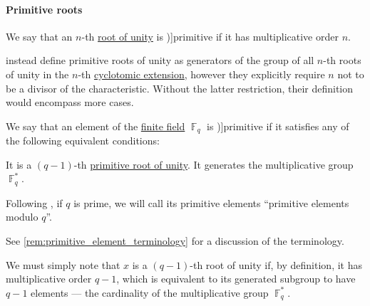 \paragraph{Primitive roots}

\begin{definition}\label{def:primitive_root_of_unity}
  We say that an \( n \)-th \hyperref[def:root_of_unity]{root of unity} is \term[ru=первообразный (корень единицы) (\cite[90]{Тыртышников2017ОсновыАлгебры})]{primitive} if it has multiplicative order \( n \).
\end{definition}
\begin{comments}
  \item \Textcite[def. 2.43]{LidlNiederreiter1997FiniteFields} instead define primitive roots of unity as generators of the group of all \( n \)-th roots of unity in the \( n \)-th \hyperref[def:cyclotomic_extension]{cyclotomic extension}, however they explicitly require \( n \) not to be a divisor of the characteristic. Without the latter restriction, their definition would encompass more cases.
\end{comments}

\begin{definition}\label{def:finite_field_primitive_element}
  We say that an element of the \hyperref[def:finite_field]{finite field} \( \BbbF_q \) is \term[en=primitive element (\cite[def. 2.9]{LidlNiederreiter1997FiniteFields})]{primitive} if it satisfies any of the following equivalent conditions:
  \begin{thmenum}
    \mimprovised It is a \( (q - 1) \)-th \hyperref[def:primitive_root_of_unity]{primitive root of unity}.
     It generates the multiplicative group \( \BbbF_q^* \).
  \end{thmenum}

  Following \textcite[20]{Knuth1997ArtVol2}, if \( q \) is prime, we will call its primitive elements \enquote{primitive elements modulo \( q \)}.
\end{definition}
\begin{comments}
  \item See \cref{rem:primitive_element_terminology} for a discussion of the terminology.
\end{comments}
\begin{defproof}
   We must simply note that \( x \) is a \( (q - 1) \)-th root of unity if, by definition, it has multiplicative order \( q - 1 \), which is equivalent to its generated subgroup to have \( q - 1 \) elements --- the cardinality of the multiplicative group \( \BbbF_q^* \).
\end{defproof}

